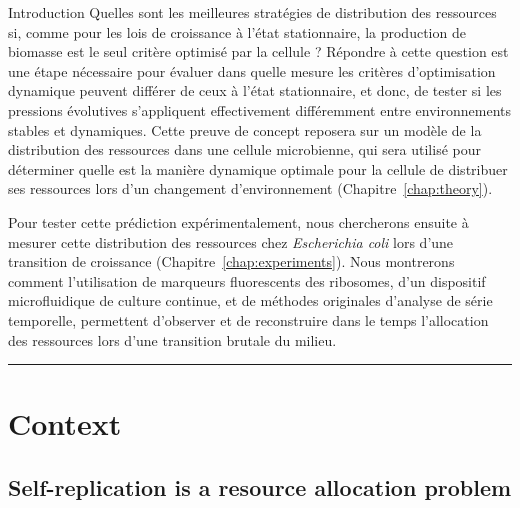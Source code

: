 \begin{chapter_summary}{Introduction}
Quelles sont les meilleures stratégies de distribution des ressources si, comme pour les lois de croissance à l'état stationnaire, la production de biomasse est le seul critère optimisé par la cellule ?
Répondre à cette question est une étape nécessaire pour évaluer dans quelle mesure les critères d'optimisation dynamique peuvent différer de ceux à l'état stationnaire, et donc, de tester si les pressions évolutives s'appliquent effectivement différemment entre environnements stables et dynamiques.
Cette preuve de concept reposera sur un modèle de la distribution des ressources dans une cellule microbienne, qui sera utilisé pour déterminer quelle est la manière dynamique optimale pour la cellule de distribuer ses ressources lors d'un changement d'environnement (Chapitre~\ref{chap:theory}).

Pour tester cette prédiction expérimentalement, nous chercherons ensuite à mesurer cette distribution des ressources chez \textit{Escherichia coli} lors d'une transition de croissance (Chapitre~\ref{chap:experiments}).
Nous montrerons comment l'utilisation de marqueurs fluorescents des ribosomes, d'un dispositif microfluidique de culture continue, et de méthodes originales d'analyse de série temporelle, permettent d'observer et de reconstruire dans le temps l'allocation des ressources lors d'une transition brutale du milieu.
\end{chapter_summary}

\begin{center}
\noindent\rule{4cm}{0.1pt}
\end{center}

\section{Context}
\label{sec:context}

\subsection{Self-replication is a resource allocation problem}

